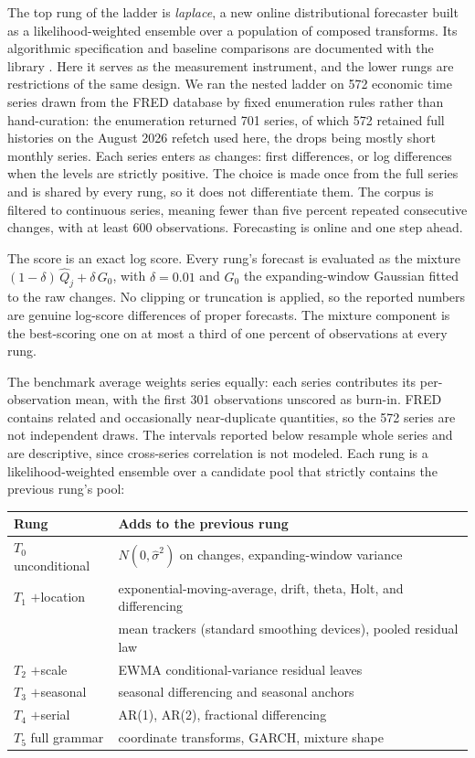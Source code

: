 \documentclass[11pt]{article}
\theoremstyle{remark}
\begin{document}
The top rung of the ladder is \emph{laplace}, a new online distributional forecaster built
as a likelihood-weighted ensemble over a population of composed transforms. Its algorithmic
specification and baseline comparisons are documented with the library
\citep{cotton_skaters}. Here it serves as the measurement instrument, and the lower rungs
are restrictions of the same design. We ran the nested ladder on 572 economic time
series drawn from the FRED database by fixed enumeration rules rather than
hand-curation: the enumeration returned 701 series, of which 572 retained full
histories on the August 2026 refetch used here, the drops being mostly short monthly
series. Each series enters as changes: first differences, or log differences when the levels are
strictly positive. The choice is made once from the full series and is shared by every rung,
so it does not differentiate them. The corpus is filtered to continuous series, meaning fewer than five percent
repeated consecutive changes, with at least 600 observations. Forecasting is online and one
step ahead.

The score is an exact log score. Every rung's forecast is evaluated as the mixture
$(1-\delta)\,\widehat Q_j+\delta\,G_0$, with $\delta=0.01$ and $G_0$ the expanding-window
Gaussian fitted to the raw changes. No clipping or truncation is applied, so the reported
numbers are genuine log-score differences of proper forecasts. The mixture component is the
best-scoring one on at most a third of one percent of observations at every rung.

The benchmark average weights series equally: each series contributes its per-observation
mean, with the first 301 observations unscored as burn-in. FRED contains related and occasionally near-duplicate
quantities, so the 572 series are not independent draws. The intervals reported below
resample whole series and are descriptive, since cross-series correlation is not modeled. Each rung is a likelihood-weighted ensemble over a candidate pool that strictly
contains the previous rung's pool:

\begin{center}
\small
\begin{tabular}{ll}
\toprule
Rung & Adds to the previous rung\\
\midrule
$T_0$ unconditional & $N(0,\hat\sigma^2)$ on changes, expanding-window variance\\
$T_1$ $+$location & exponential-moving-average, drift, theta, Holt, and differencing\\
 & \quad mean trackers (standard smoothing devices), pooled residual law\\
$T_2$ $+$scale & EWMA conditional-variance residual leaves\\
$T_3$ $+$seasonal & seasonal differencing and seasonal anchors\\
$T_4$ $+$serial & AR(1), AR(2), fractional differencing\\
$T_5$ full grammar & coordinate transforms, GARCH, mixture shape\\
\bottomrule
\end{tabular}
\end{center}
\end{document}
